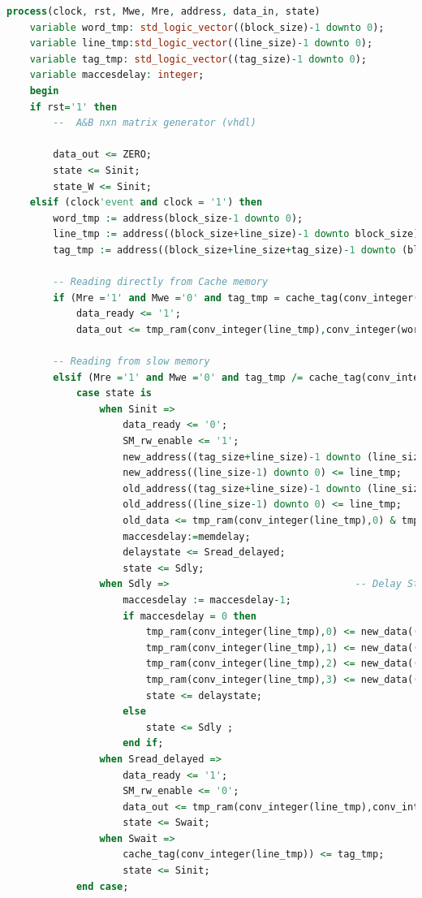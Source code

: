 \documentclass[]{article}
\begin{document}
\begin{lstlisting}[language=vhdl, caption={Cache controller vhdl}, label={}]
process(clock, rst, Mwe, Mre, address, data_in, state)
	variable word_tmp: std_logic_vector((block_size)-1 downto 0);	
	variable line_tmp:std_logic_vector((line_size)-1 downto 0);
	variable tag_tmp: std_logic_vector((tag_size)-1 downto 0);
	variable maccesdelay: integer;
	begin
	if rst='1' then					
		--	A&B nxn matrix generator (vhdl)
			
		data_out <= ZERO;
		state <= Sinit;
		state_W <= Sinit;
	elsif (clock'event and clock = '1') then
		word_tmp := address(block_size-1 downto 0);
		line_tmp := address((block_size+line_size)-1 downto block_size);
		tag_tmp := address((block_size+line_size+tag_size)-1 downto (block_size+line_size));
	
		-- Reading directly from Cache memory
		if (Mre ='1' and Mwe ='0' and tag_tmp = cache_tag(conv_integer(line_tmp))) then
			data_ready <= '1';		
			data_out <= tmp_ram(conv_integer(line_tmp),conv_integer(word_tmp));
		
		-- Reading from slow memory
		elsif (Mre ='1' and Mwe ='0' and tag_tmp /= cache_tag(conv_integer(line_tmp))) then	
			case state is
				when Sinit =>
					data_ready <= '0';
					SM_rw_enable <= '1';
					new_address((tag_size+line_size)-1 downto (line_size)) <= tag_tmp;
					new_address((line_size-1) downto 0) <= line_tmp;
					old_address((tag_size+line_size)-1 downto (line_size)) <= cache_tag(conv_integer(line_tmp));
					old_address((line_size-1) downto 0) <= line_tmp;
					old_data <= tmp_ram(conv_integer(line_tmp),0) & tmp_ram(conv_integer(line_tmp),1) & tmp_ram(conv_integer(line_tmp),2) & tmp_ram(conv_integer(line_tmp),3);
					maccesdelay:=memdelay;
					delaystate <= Sread_delayed;
					state <= Sdly;
				when Sdly =>								-- Delay State	
					maccesdelay := maccesdelay-1;
					if maccesdelay = 0 then 
						tmp_ram(conv_integer(line_tmp),0) <= new_data((data_width*(2**block_size))-1 downto (data_width*(2**block_size-1)));
						tmp_ram(conv_integer(line_tmp),1) <= new_data((data_width*(2**block_size-1))-1 downto (data_width*(2**block_size-2)));
						tmp_ram(conv_integer(line_tmp),2) <= new_data((data_width*(2**block_size-2))-1 downto (data_width*(2**block_size-3)));
						tmp_ram(conv_integer(line_tmp),3) <= new_data((data_width*(2**block_size-3))-1 downto 0);
						state <= delaystate;
					else 
						state <= Sdly ;
					end if;
				when Sread_delayed =>
					data_ready <= '1';
					SM_rw_enable <= '0';
					data_out <= tmp_ram(conv_integer(line_tmp),conv_integer(word_tmp));
					state <= Swait;
				when Swait =>
					cache_tag(conv_integer(line_tmp)) <= tag_tmp;
					state <= Sinit;
			end case;
		

\end{lstlisting}
\end{document}
